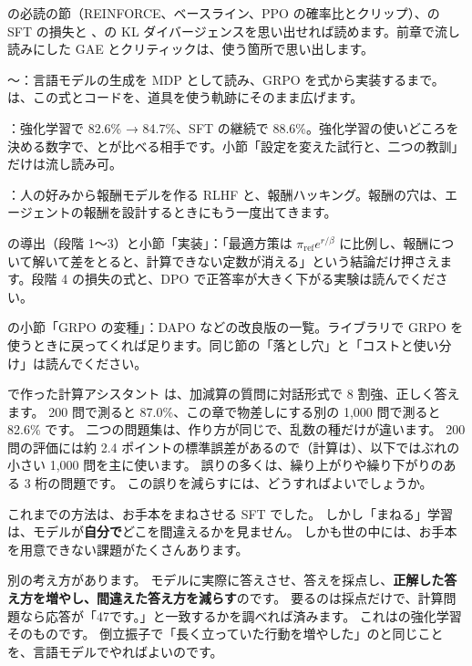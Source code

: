 \begin{readingguide}
\item[\rgpre] の必読の節（REINFORCE、ベースライン、PPO の確率比とクリップ）、の SFT の損失と 、の KL ダイバージェンスを思い出せれば読めます。前章で流し読みにした GAE とクリティックは、使う箇所で思い出します。
\item[\rgmust] 〜：言語モデルの生成を MDP として読み、GRPO を式から実装するまで。は、この式とコードを、道具を使う軌跡にそのまま広げます。
\item[\rgmust] ：強化学習で 82.6\% → 84.7\%、SFT の継続で 88.6\%。強化学習の使いどころを決める数字で、とが比べる相手です。小節「設定を変えた試行と、二つの教訓」だけは流し読み可。
\item[\rgmust] ：人の好みから報酬モデルを作る RLHF と、報酬ハッキング。報酬の穴は、エージェントの報酬を設計するときにもう一度出てきます。
\item[\rgskim] の導出（段階 1〜3）と小節「実装」：「最適方策は $\pi_{\text{ref}}e^{r/\beta}$ に比例し、報酬について解いて差をとると、計算できない定数が消える」という結論だけ押さえます。段階 4 の損失の式と、DPO で正答率が大きく下がる実験は読んでください。
\item[\rglater] の小節「GRPO の変種」：DAPO などの改良版の一覧。ライブラリで GRPO を使うときに戻ってくれば足ります。同じ節の「落とし穴」と「コストと使い分け」は読んでください。
\end{readingguide}

で作った計算アシスタント  は、加減算の質問に対話形式で 8 割強、正しく答えます。
200 問で測ると 87.0\%、この章で物差しにする別の 1,000 問で測ると 82.6\% です。
二つの問題集は、作り方が同じで、乱数の種だけが違います。
200 問の評価には約 2.4 ポイントの標準誤差があるので（計算は）、以下ではぶれの小さい 1,000 問を主に使います。
誤りの多くは、繰り上がりや繰り下がりのある 3 桁の問題です。
この誤りを減らすには、どうすればよいでしょうか。

これまでの方法は、お手本をまねさせる SFT でした。
しかし「まねる」学習は、モデルが\textbf{自分で}どこを間違えるかを見ません。
しかも世の中には、お手本を用意できない課題がたくさんあります。

別の考え方があります。
モデルに実際に答えさせ、答えを採点し、\textbf{正解した答え方を増やし、間違えた答え方を減らす}のです。
要るのは採点だけで、計算問題なら応答が「47です。」と一致するかを調べれば済みます。
これはの強化学習そのものです。
倒立振子で「長く立っていた行動を増やした」のと同じことを、言語モデルでやればよいのです。

